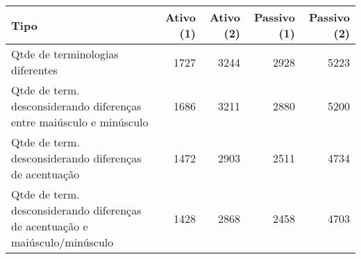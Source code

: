 \begin{table}[ht]
\centering
\begin{tabular}{lrrrr}
  \hline
Tipo & Ativo (1) & Ativo (2) & Passivo (1) & Passivo (2) \\ 
  \hline
Qtde de terminologias diferentes & 1727 & 3244 & 2928 & 5223 \\ 
  Qtde de term. desconsiderando diferenças entre maiúsculo e minúsculo & 1686 & 3211 & 2880 & 5200 \\ 
  Qtde de term. desconsiderando diferenças de acentuação & 1472 & 2903 & 2511 & 4734 \\ 
  Qtde de term. desconsiderando diferenças de acentuação e
          maiúsculo/minúsculo & 1428 & 2868 & 2458 & 4703 \\ 
   \hline
\end{tabular}
\end{table}
